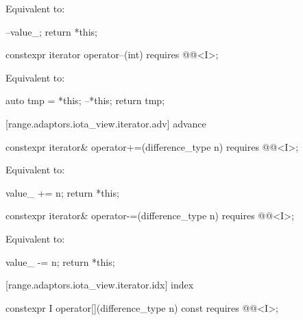 \begin{addedblock}
\begin{itemdescr}
\pnum
\effects Equivalent to:
\begin{codeblock}
--value_;
return *this;
\end{codeblock}
\end{itemdescr}

\begin{itemdecl}
constexpr iterator operator--(int) requires @@<I>;
\end{itemdecl}

\begin{itemdescr}
\pnum
\effects Equivalent to:
\begin{codeblock}
auto tmp = *this;
--*this;
return tmp;
\end{codeblock}
\end{itemdescr}

[range.adaptors.iota_view.iterator.adv]{ advance}

\begin{itemdecl}
constexpr iterator& operator+=(difference_type n)
  requires @@<I>;
\end{itemdecl}

\begin{itemdescr}
\pnum
\effects Equivalent to:
\begin{codeblock}
value_ += n;
return *this;
\end{codeblock}
\end{itemdescr}

\begin{itemdecl}
constexpr iterator& operator-=(difference_type n)
  requires @@<I>;
\end{itemdecl}

\begin{itemdescr}
\pnum
\effects Equivalent to:
\begin{codeblock}
value_ -= n;
return *this;
\end{codeblock}
\end{itemdescr}

[range.adaptors.iota_view.iterator.idx]{ index}

\begin{itemdecl}
constexpr I operator[](difference_type n) const
  requires @@<I>;
\end{itemdecl}


\end{addedblock}
